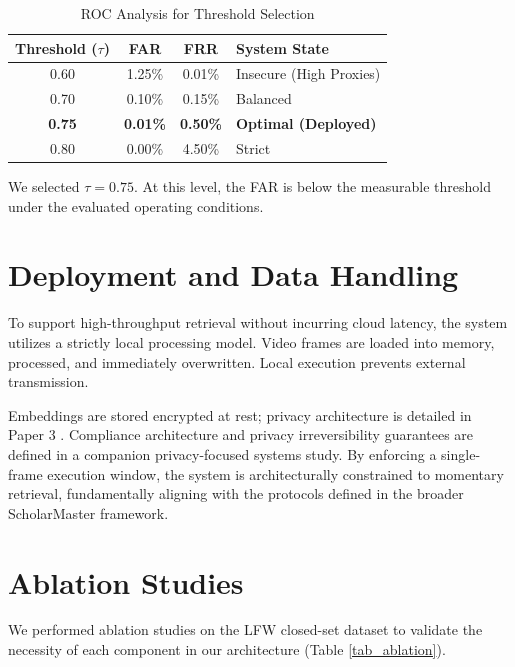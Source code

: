 \documentclass[conference]{IEEEtran}
\begin{document}
\begin{table}[htbp]
\caption{ROC Analysis for Threshold Selection}
\begin{center}
\begin{tabular}{|c|c|c|l|}
\hline
\textbf{Threshold ($\tau$)} & \textbf{FAR} & \textbf{FRR} & \textbf{System State} \\
\hline
0.60 & 1.25\% & 0.01\% & Insecure (High Proxies) \\
\hline
0.70 & 0.10\% & 0.15\% & Balanced \\
\hline
\textbf{0.75} & \textbf{0.01\%} & \textbf{0.50\%} & \textbf{Optimal (Deployed)} \\
\hline
0.80 & 0.00\% & 4.50\% & Strict \\
\hline
\end{tabular}
\label{tab_roc}
\end{center}
\end{table}

We selected $\tau = 0.75$. At this level, the FAR is below the measurable threshold under the evaluated operating conditions.

\section{Deployment and Data Handling}

To support high-throughput retrieval without incurring cloud latency, the system utilizes a strictly local processing model. Video frames are loaded into memory, processed, and immediately overwritten. Local execution prevents external transmission.

Embeddings are stored encrypted at rest; privacy architecture is detailed in Paper 3 \cite{p3}. Compliance architecture and privacy irreversibility guarantees are defined in a companion privacy-focused systems study. By enforcing a single-frame execution window, the system is architecturally constrained to momentary retrieval, fundamentally aligning with the protocols defined in the broader ScholarMaster framework.

\section{Ablation Studies}
We performed ablation studies on the LFW closed-set dataset to validate the necessity of each component in our architecture (Table \ref{tab_ablation}).
\end{document}

